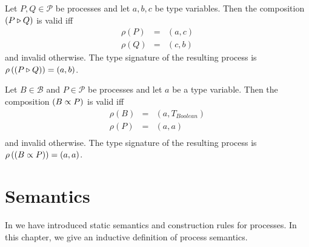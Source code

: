 \begin{definition}
\label{def:static_sequence}
Let $P, Q \in \mathcal{P}$ be processes and let $a, b, c$ be type variables. Then the composition $\left( P \triangleright Q \right)$ is valid iff
\begin{eqnarray*}
  \rho \left( P \right) & = & \left( a, c \right) \\
  \rho \left( Q \right) & = & \left( c, b \right)
\end{eqnarray*}
and invalid otherwise. The type signature of the resulting process is $\rho \left( \left( P \triangleright Q \right) \right) = \left( a, b \right)$.

\hfill\qedsymbol
\end{definition}


\begin{definition}
\label{def:static_repetition}
Let $B \in \mathcal{B}$ and $P \in \mathcal{P}$ be processes and let $a$ be a type variable. Then the composition $\left( B \propto P \right)$ is valid iff
\begin{eqnarray*}
  \rho \left( B \right) & = & \left( a, T_{Boolean} \right) \\
  \rho \left( P \right) & = & \left( a, a \right) \\
\end{eqnarray*}
and invalid otherwise. The type signature of the resulting process is $\rho \left( \left( B \propto P \right) \right) = \left( a, a \right)$.

\hfill\qedsymbol
\end{definition}




\section{Semantics}
\label{chp:semantics}
In  we have introduced static semantics and construction rules for processes. In this chapter, we give an inductive definition of process semantics. %

